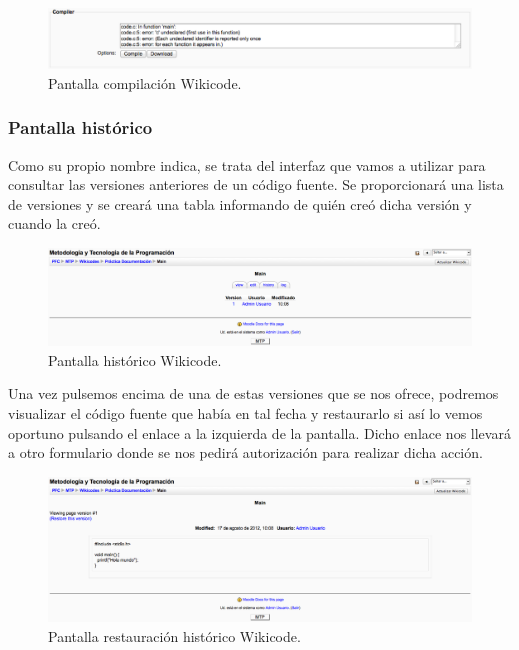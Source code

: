 \begin{figure}[h]
	\begin{center}
	\includegraphics[width=\textwidth]{./img/c4compile.eps}
	\caption{Pantalla compilación Wikicode.}
	\end{center}
\end{figure}

\newpage

\subsubsection{Pantalla histórico}

Como su propio nombre indica, se trata del interfaz que vamos a utilizar para consultar las versiones anteriores de un código fuente. Se proporcionará una lista de versiones y se creará una tabla informando de quién creó dicha versión y cuando la creó.

\begin{figure}[h]
	\begin{center}
	\includegraphics[width=\textwidth]{./img/c4history1.eps}
	\caption{Pantalla histórico Wikicode.}
	\end{center}
\end{figure}

Una vez pulsemos encima de una de estas versiones que se nos ofrece, podremos visualizar el código fuente que había en tal fecha y restaurarlo si así lo vemos oportuno pulsando el enlace a la izquierda de la pantalla. Dicho enlace nos llevará a otro formulario donde se nos pedirá autorización para realizar dicha acción.

\begin{figure}[h]
	\begin{center}
	\includegraphics[width=\textwidth]{./img/c4history2.eps}
	\caption{Pantalla restauración histórico Wikicode.}
	\end{center}
\end{figure}


